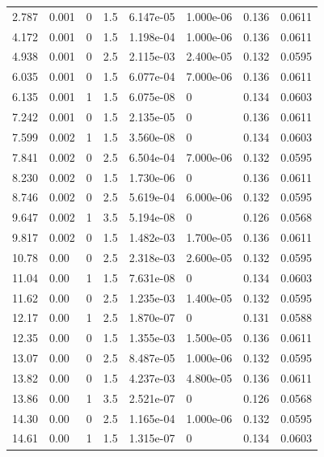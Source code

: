 \documentclass[preview]{standalone}
\begin{document}
{{\begin{tabular}{L{1.2cm}C{1.2cm} C{0.3cm}C{0.5cm} C{1.4cm}C{1.4cm} C{1.4cm}C{1.4cm}}
  2.787  &  0.001  & 0     & 1.5 &  6.147e-05  & 1.000e-06  & 0.136 &  0.0611   \\ 
  4.172  &  0.001  & 0     & 1.5 &  1.198e-04  & 1.000e-06  & 0.136 &  0.0611   \\ 
  4.938  &  0.001  & 0     & 2.5 &  2.115e-03  & 2.400e-05  & 0.132 &  0.0595   \\ 
  6.035  &  0.001  & 0     & 1.5 &  6.077e-04  & 7.000e-06  & 0.136 &  0.0611   \\ 
  6.135  &  0.001  & 1     & 1.5 &  6.075e-08  & 0  & 0.134 &  0.0603   \\ 
  7.242  &  0.001  & 0     & 1.5 &  2.135e-05  & 0  & 0.136 &  0.0611   \\ 
  7.599  &  0.002  & 1     & 1.5 &  3.560e-08  & 0  & 0.134 &  0.0603   \\ 
  7.841  &  0.002  & 0     & 2.5 &  6.504e-04  & 7.000e-06  & 0.132 &  0.0595   \\ 
  8.230  &  0.002  & 0     & 1.5 &  1.730e-06  & 0  & 0.136 &  0.0611   \\ 
  8.746  &  0.002  & 0     & 2.5 &  5.619e-04  & 6.000e-06  & 0.132 &  0.0595   \\ 
  9.647  &  0.002  & 1     & 3.5 &  5.194e-08  & 0  & 0.126 &  0.0568   \\ 
  9.817  &  0.002  & 0     & 1.5 &  1.482e-03  & 1.700e-05  & 0.136 &  0.0611   \\ 
  10.78  &  0.00  & 0     & 2.5 &  2.318e-03  & 2.600e-05  & 0.132 &  0.0595   \\ 
  11.04  &  0.00  & 1     & 1.5 &  7.631e-08  & 0  & 0.134 &  0.0603   \\ 
  11.62  &  0.00  & 0     & 2.5 &  1.235e-03  & 1.400e-05  & 0.132 &  0.0595   \\ 
  12.17  &  0.00  & 1     & 2.5 &  1.870e-07  & 0  & 0.131 &  0.0588   \\ 
  12.35  &  0.00  & 0     & 1.5 &  1.355e-03  & 1.500e-05  & 0.136 &  0.0611   \\ 
  13.07  &  0.00  & 0     & 2.5 &  8.487e-05  & 1.000e-06  & 0.132 &  0.0595   \\ 
  13.82  &  0.00  & 0     & 1.5 &  4.237e-03  & 4.800e-05  & 0.136 &  0.0611   \\ 
  13.86  &  0.00  & 1     & 3.5 &  2.521e-07  & 0  & 0.126 &  0.0568   \\ 
  14.30  &  0.00  & 0     & 2.5 &  1.165e-04  & 1.000e-06  & 0.132 &  0.0595   \\ 
  14.61  &  0.00  & 1     & 1.5 &  1.315e-07  & 0  & 0.134 &  0.0603   \\ 

\end{tabular}}}
\end{document}
